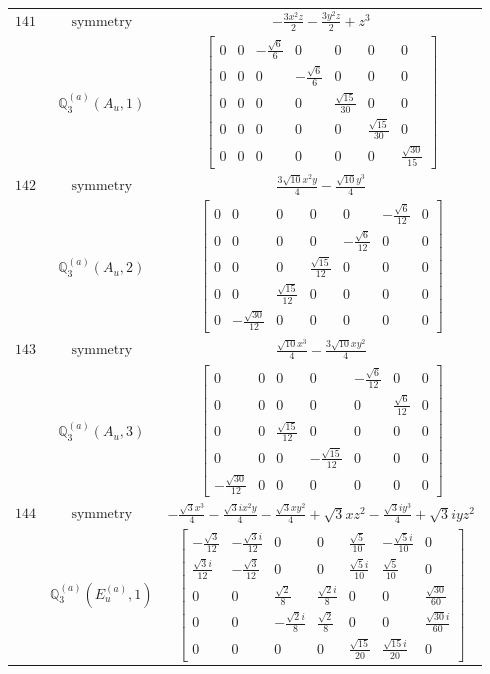 \documentclass[fleqn,8pt,landscape]{jsarticle}
\begin{document}
\begin{longtable}{ccc}
$ 141 $ & $ \text{symmetry} $ & $ - \frac{3 x^{2} z}{2} - \frac{3 y^{2} z}{2} + z^{3} $ \\
$  $ & $ \mathbb{Q}_{3}^{(a)}(A_{u},1) $ & $ \begin{bmatrix} 0 & 0 & - \frac{\sqrt{6}}{6} & 0 & 0 & 0 & 0 \\ 0 & 0 & 0 & - \frac{\sqrt{6}}{6} & 0 & 0 & 0 \\ 0 & 0 & 0 & 0 & \frac{\sqrt{15}}{30} & 0 & 0 \\ 0 & 0 & 0 & 0 & 0 & \frac{\sqrt{15}}{30} & 0 \\ 0 & 0 & 0 & 0 & 0 & 0 & \frac{\sqrt{30}}{15} \end{bmatrix} $ \\ \hline
$ 142 $ & $ \text{symmetry} $ & $ \frac{3 \sqrt{10} x^{2} y}{4} - \frac{\sqrt{10} y^{3}}{4} $ \\
$  $ & $ \mathbb{Q}_{3}^{(a)}(A_{u},2) $ & $ \begin{bmatrix} 0 & 0 & 0 & 0 & 0 & - \frac{\sqrt{6}}{12} & 0 \\ 0 & 0 & 0 & 0 & - \frac{\sqrt{6}}{12} & 0 & 0 \\ 0 & 0 & 0 & \frac{\sqrt{15}}{12} & 0 & 0 & 0 \\ 0 & 0 & \frac{\sqrt{15}}{12} & 0 & 0 & 0 & 0 \\ 0 & - \frac{\sqrt{30}}{12} & 0 & 0 & 0 & 0 & 0 \end{bmatrix} $ \\ \hline
$ 143 $ & $ \text{symmetry} $ & $ \frac{\sqrt{10} x^{3}}{4} - \frac{3 \sqrt{10} x y^{2}}{4} $ \\
$  $ & $ \mathbb{Q}_{3}^{(a)}(A_{u},3) $ & $ \begin{bmatrix} 0 & 0 & 0 & 0 & - \frac{\sqrt{6}}{12} & 0 & 0 \\ 0 & 0 & 0 & 0 & 0 & \frac{\sqrt{6}}{12} & 0 \\ 0 & 0 & \frac{\sqrt{15}}{12} & 0 & 0 & 0 & 0 \\ 0 & 0 & 0 & - \frac{\sqrt{15}}{12} & 0 & 0 & 0 \\ - \frac{\sqrt{30}}{12} & 0 & 0 & 0 & 0 & 0 & 0 \end{bmatrix} $ \\ \hline
$ 144 $ & $ \text{symmetry} $ & $ - \frac{\sqrt{3} x^{3}}{4} - \frac{\sqrt{3} i x^{2} y}{4} - \frac{\sqrt{3} x y^{2}}{4} + \sqrt{3} x z^{2} - \frac{\sqrt{3} i y^{3}}{4} + \sqrt{3} i y z^{2} $ \\
$  $ & $ \mathbb{Q}_{3}^{(a)}(E_{u}^{(a)},1) $ & $ \begin{bmatrix} - \frac{\sqrt{3}}{12} & - \frac{\sqrt{3} i}{12} & 0 & 0 & \frac{\sqrt{5}}{10} & - \frac{\sqrt{5} i}{10} & 0 \\ \frac{\sqrt{3} i}{12} & - \frac{\sqrt{3}}{12} & 0 & 0 & \frac{\sqrt{5} i}{10} & \frac{\sqrt{5}}{10} & 0 \\ 0 & 0 & \frac{\sqrt{2}}{8} & \frac{\sqrt{2} i}{8} & 0 & 0 & \frac{\sqrt{30}}{60} \\ 0 & 0 & - \frac{\sqrt{2} i}{8} & \frac{\sqrt{2}}{8} & 0 & 0 & \frac{\sqrt{30} i}{60} \\ 0 & 0 & 0 & 0 & \frac{\sqrt{15}}{20} & \frac{\sqrt{15} i}{20} & 0 \end{bmatrix} $ \\ \hline

\end{longtable}
\end{document}
